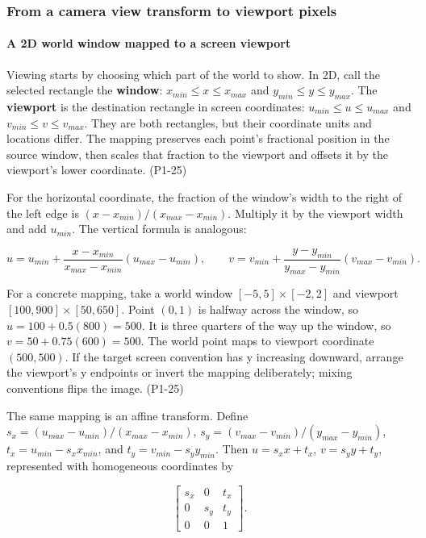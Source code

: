 \subsubsection{From a camera view transform to viewport pixels}\label{from-a-camera-view-transform-to-viewport-pixels}

\paragraph{A 2D world window mapped to a screen viewport}\label{a-2d-world-window-mapped-to-a-screen-viewport}

Viewing starts by choosing which part of the world to show. In 2D, call the selected rectangle the \textbf{window}: \(x_{min}\leq x\leq x_{max}\) and \(y_{min}\leq y\leq y_{max}\). The \textbf{viewport} is the destination rectangle in screen coordinates: \(u_{min}\leq u\leq u_{max}\) and \(v_{min}\leq v\leq v_{max}\). They are both rectangles, but their coordinate units and locations differ. The mapping preserves each point's fractional position in the source window, then scales that fraction to the viewport and offsets it by the viewport's lower coordinate. (P1-25)

For the horizontal coordinate, the fraction of the window's width to the right of the left edge is \((x-x_{min})/(x_{max}-x_{min})\). Multiply it by the viewport width and add \(u_{min}\). The vertical formula is analogous:

\[
u=u_{min}+\frac{x-x_{min}}{x_{max}-x_{min}}(u_{max}-u_{min}),\qquad
v=v_{min}+\frac{y-y_{min}}{y_{max}-y_{min}}(v_{max}-v_{min}).
\]

For a concrete mapping, take a world window \([-5,5]\times[-2,2]\) and viewport \([100,900]\times[50,650]\). Point \((0,1)\) is halfway across the window, so \(u=100+0.5(800)=500\). It is three quarters of the way up the window, so \(v=50+0.75(600)=500\). The world point maps to viewport coordinate \((500,500)\). If the target screen convention has y increasing downward, arrange the viewport's y endpoints or invert the mapping deliberately; mixing conventions flips the image. (P1-25)

The same mapping is an affine transform. Define \(s_x=(u_{max}-u_{min})/(x_{max}-x_{min})\), \(s_y=(v_{max}-v_{min})/(y_{max}-y_{min})\), \(t_x=u_{min}-s_xx_{min}\), and \(t_y=v_{min}-s_yy_{min}\). Then \(u=s_xx+t_x\), \(v=s_yy+t_y\), represented with homogeneous coordinates by

\[
\begin{bmatrix}s_x&0&t_x\\0&s_y&t_y\\0&0&1\end{bmatrix}.
\]

